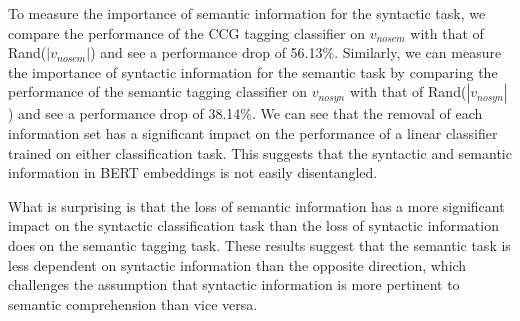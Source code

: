 \documentclass[11pt,a4paper]{article}
\begin{document}
To measure the importance of semantic information for the syntactic task, we compare the performance of the CCG tagging classifier on $v_{nosem}$ with that of Rand($|v_{nosem}|$) and see a performance drop of 56.13\%. Similarly, we can measure the importance of syntactic information for the semantic task by comparing the performance of the semantic tagging classifier on $v_{nosyn}$ with that of Rand($|v_{nosyn}|$) and see a performance drop of 38.14\%. We can see that the removal of each information set has a significant impact on the performance of a linear classifier trained on either classification task. This suggests that the syntactic and semantic information in BERT embeddings is not easily disentangled. 

What is surprising is that the loss of semantic information has a more significant impact on the syntactic classification task than the loss of syntactic information does on the semantic tagging task. These results suggest that the semantic task is less dependent on syntactic information than the opposite direction, which challenges the assumption that syntactic information is more pertinent to semantic comprehension than vice versa. 




\end{document}
